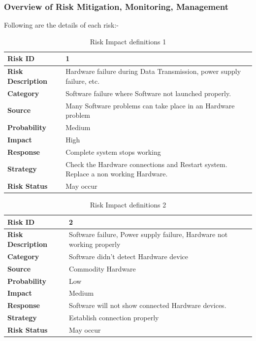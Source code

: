\documentclass[12pt,a4paper]
{article}
\numberwithin{table}{section}
\begin{document}
{{{{{\subsubsection{Overview of Risk Mitigation, Monitoring, Management}
Following are the details of each risk:-
\begin{table}[htbp]
\begin{center}
\begin{tabular}{|l|p{300pt}|}
\hline
\textbf{Risk ID}& 
1 \\
\hline
\textbf{Risk Description}& 
Hardware failure during Data Transmission, power supply failure, etc.\\
\hline
\textbf{Category}& 
Software failure where Software not launched properly. \\
\hline
\textbf{Source}& 
Many Software problems can take place in an Hardware problem \\
\hline
\textbf{Probability}& 
Medium \\
\hline
\textbf{Impact}& 
High \\
\hline
\textbf{Response}& 
Complete system stops working \\
\hline
\textbf{Strategy}& 
Check the Hardware connections and Restart system. Replace a non working Hardware.
\\
\hline
\textbf{Risk Status}& 
May occur \\
\hline
\end{tabular}
\caption{Risk Impact definitions 1} 
\label{tab1}
\end{center}
\end{table}


\begin{table}[htbp]
\begin{center}
\begin{tabular}{|l|p{300pt}|}
\hline
\textbf{Risk ID}& 
2 \\
\hline
\textbf{Risk Description}& 
Software failure, Power supply failure, Hardware not working properly\\
\hline
\textbf{Category}& 
Software didn't detect Hardware device\\
\hline
\textbf{Source}& 
Commodity Hardware \\
\hline
\textbf{Probability}& 
Low \\
\hline
\textbf{Impact}& 
Medium \\
\hline
\textbf{Response}& 
Software will not show connected Hardware devices.
\\
\hline
\textbf{Strategy}& 
Establish connection properly  \\
\hline
\textbf{Risk Status}& 
May occur \\
\hline
\end{tabular}
\caption{Risk Impact definitions 2 }
\label{tab1}
\end{center}
\end{table}

}}}}}
\end{document}
